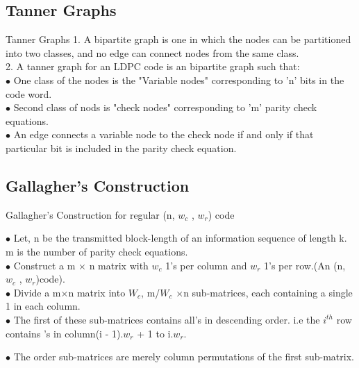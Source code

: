 \subsection{Tanner Graphs}
\begin{frame}{Tanner Graphs}
1. A bipartite graph is one in which the nodes can be partitioned into two classes, and no edge can connect nodes from the same class.\\
2. A tanner graph for an LDPC code is an bipartite graph such that:\\
\;\;\;\;\; $\bullet$ One class of the nodes is the "Variable nodes" corresponding to 'n' bits in the code word.\\
\;\;\;\;\; $\bullet$ Second class of nods is "check nodes" corresponding to 'm' parity check equations.\\
\;\;\;\;\; $\bullet$ An edge connects a variable node to the check node if and only if that particular bit is included in the parity check equation.
\end{frame}

\subsection{Gallagher's Construction}
\begin{frame}{Gallagher's Construction for regular (n, $w_c$ , $w_r$) code}

$\bullet$ Let, n be the transmitted block-length of an information sequence of length k. m is the number of parity check equations.\\
$\bullet$ Construct a m $\times$ n matrix with $w_c$ 1's per column and $w_r$ 1's per row.(An (n, $w_c$ , $w_r$)code).\\
$\bullet$ Divide a m$\times$n matrix into $W_c$, m/$W_c$ $\times$n sub-matrices, each containing a single 1 in each column.\\
$\bullet$ The first of these sub-matrices contains all's in descending order.  i.e the $i^{th}$ row contains  's in column(i - 1).$w_r$ + 1 to i.$w_r$.

$\bullet$  The order sub-matrices are merely column permutations of the first sub-matrix.

\end{frame}



